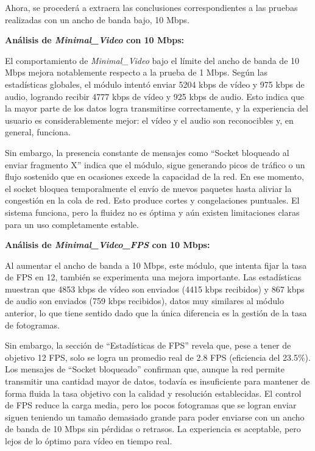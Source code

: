 \newpage

Ahora, se procederá a extraera las conclusiones correspondientes a las pruebas realizadas con un ancho de banda bajo, 10 Mbps.
\vspace{\baselineskip}

\textbf{Análisis de \textit{Minimal\_Video} con 10 Mbps:}
\vspace{\baselineskip}

El comportamiento de \textit{Minimal\_Video} bajo el límite del ancho de banda de 10 Mbps mejora notablemente respecto a la prueba de 1 Mbps. Según las estadísticas globales, el módulo intentó enviar 5204 kbps de vídeo y 975 kbps de audio, logrando recibir 4777 kbps de vídeo y 925 kbps de audio. Esto indica que la mayor parte de los datos logra transmitirse correctamente, y la experiencia del usuario es considerablemente mejor: el vídeo y el audio son reconocibles y, en general, funciona.
\vspace{\baselineskip}

Sin embargo, la presencia constante de mensajes como ``Socket bloqueado al enviar fragmento X'' indica que el módulo, sigue generando picos de tráfico o un flujo sostenido que en ocasiones excede la capacidad de la red. En ese momento, el socket bloquea temporalmente el envío de nuevos paquetes hasta aliviar la congestión en la cola de red. Esto produce cortes y congelaciones puntuales. El sistema funciona, pero la fluidez no es óptima y aún existen limitaciones claras para un uso completamente estable.

\vspace{\baselineskip}

\textbf{Análisis de \textit{Minimal\_Video\_FPS} con 10 Mbps:}
\vspace{\baselineskip}

Al aumentar el ancho de banda a 10 Mbps, este módulo, que intenta fijar la tasa de FPS en 12, también se experimenta una mejora importante. Las estadísticas muestran que 4853 kbps de vídeo son enviados (4415 kbps recibidos) y 867 kbps de audio son enviados (759 kbps recibidos), datos muy similares al módulo anterior, lo que tiene sentido dado que la única diferencia es la gestión de la tasa de fotogramas.
\vspace{\baselineskip}

Sin embargo, la sección de ``Estadísticas de FPS'' revela que, pese a tener de objetivo 12 FPS, solo se logra un promedio real de 2.8 FPS (eficiencia del 23.5\%). Los mensajes de ``Socket bloqueado'' confirman que, aunque la red permite transmitir una cantidad mayor de datos, todavía es insuficiente para mantener de forma fluida la tasa objetivo con la calidad y resolución establecidas. El control de FPS reduce la carga media, pero los pocos fotogramas que se logran enviar siguen teniendo un tamaño demasiado grande para poder enviarse con un ancho de banda de 10 Mbps sin pérdidas o retrasos. La experiencia es aceptable, pero lejos de lo óptimo para vídeo en tiempo real.

